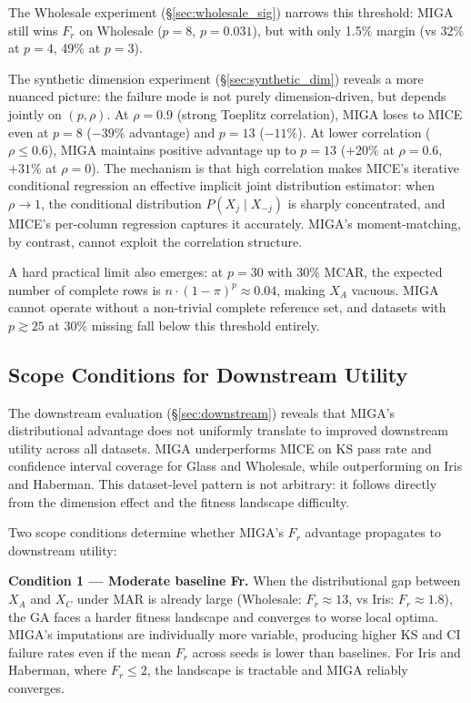 The Wholesale experiment (\S\ref{sec:wholesale_sig}) narrows this threshold: MIGA still wins $F_r$ on Wholesale ($p = 8$, $p = 0.031$), but with only 1.5\% margin (vs 32\% at $p=4$, 49\% at $p=3$).

The synthetic dimension experiment (\S\ref{sec:synthetic_dim}) reveals a more nuanced picture: the failure mode is not purely dimension-driven, but depends jointly on $(p, \rho)$. At $\rho = 0.9$ (strong Toeplitz correlation), MIGA loses to MICE even at $p = 8$ ($-39\%$ advantage) and $p = 13$ ($-11\%$). At lower correlation ($\rho \leq 0.6$), MIGA maintains positive advantage up to $p = 13$ ($+20\%$ at $\rho=0.6$, $+31\%$ at $\rho=0$). The mechanism is that high correlation makes MICE's iterative conditional regression an effective implicit joint distribution estimator: when $\rho \to 1$, the conditional distribution $P(X_j \mid X_{-j})$ is sharply concentrated, and MICE's per-column regression captures it accurately. MIGA's moment-matching, by contrast, cannot exploit the correlation structure.

A hard practical limit also emerges: at $p = 30$ with 30\% MCAR, the expected number of complete rows is $n \cdot (1-\pi)^p \approx 0.04$, making $X_A$ vacuous. MIGA cannot operate without a non-trivial complete reference set, and datasets with $p \gtrsim 25$ at 30\% missing fall below this threshold entirely.

\subsection{Scope Conditions for Downstream Utility}
\label{sec:scope_conditions}

The downstream evaluation (§\ref{sec:downstream}) reveals that MIGA's distributional advantage does not uniformly translate to improved downstream utility across all datasets. MIGA underperforms MICE on KS pass rate and confidence interval coverage for Glass and Wholesale, while outperforming on Iris and Haberman. This dataset-level pattern is not arbitrary: it follows directly from the dimension effect and the fitness landscape difficulty.

Two scope conditions determine whether MIGA's $F_r$ advantage propagates to downstream utility:

\textbf{Condition 1 — Moderate baseline Fr.} When the distributional gap between $X_A$ and $X_C$ under MAR is already large (Wholesale: $F_r \approx 13$, vs Iris: $F_r \approx 1.8$), the GA faces a harder fitness landscape and converges to worse local optima. MIGA's imputations are individually more variable, producing higher KS and CI failure rates even if the mean $F_r$ across seeds is lower than baselines. For Iris and Haberman, where $F_r \leq 2$, the landscape is tractable and MIGA reliably converges.


